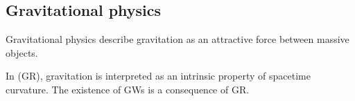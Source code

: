 \subsection{Gravitational physics}


\begin{frame}{Gravitational physics}
    { describe gravitation as an attractive force between massive objects.
    }\par\medskip
    {In  (GR), gravitation is interpreted as an intrinsic property of spacetime curvature. %
    }%
    {The existence of GWs is a consequence of GR. 
    }





\end{frame}
